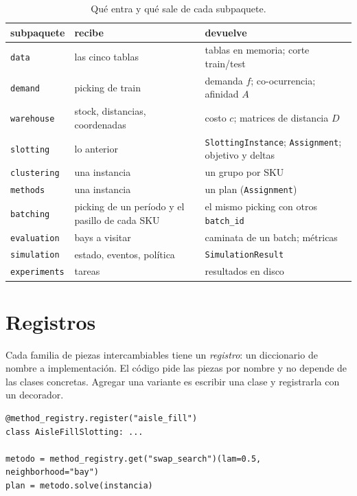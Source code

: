 \documentclass[11pt,a4paper,oneside]{report}
\newcommand{\code}[1]{\texttt{\small #1}}
\begin{document}
\begin{table}[ht]
\centering\small
\begin{tabularx}{\textwidth}{@{}l L L@{}}
\toprule
subpaquete & recibe & devuelve \\
\midrule
\code{data} & las cinco tablas & tablas en memoria; corte train/test \\
\code{demand} & picking de train & demanda $f$; co-ocurrencia; afinidad $A$ \\
\code{warehouse} & stock, distancias, coordenadas & costo $c$; matrices de distancia $D$ \\
\code{slotting} & lo anterior & \code{SlottingInstance}; \code{Assignment}; objetivo y deltas \\
\code{clustering} & una instancia & un grupo por SKU \\
\code{methods} & una instancia & un plan (\code{Assignment}) \\
\code{batching} & picking de un período y el pasillo de cada SKU & el mismo picking con otros \code{batch\_id} \\
\code{evaluation} & bays a visitar & caminata de un batch; métricas \\
\code{simulation} & estado, eventos, política & \code{SimulationResult} \\
\code{experiments} & tareas & resultados en disco \\
\bottomrule
\end{tabularx}
\caption{Qué entra y qué sale de cada subpaquete.}
\end{table}

\section{Registros}
\label{sec:registros}

Cada familia de piezas intercambiables tiene un \emph{registro}: un diccionario de nombre a
implementación. El código pide las piezas por nombre y no depende de las clases concretas.
Agregar una variante es escribir una clase y registrarla con un decorador.

\begin{lstlisting}
@method_registry.register("aisle_fill")
class AisleFillSlotting: ...

metodo = method_registry.get("swap_search")(lam=0.5, neighborhood="bay")
plan = metodo.solve(instancia)
\end{lstlisting}
\end{document}
